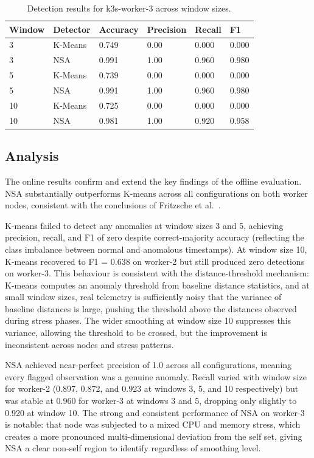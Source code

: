 \begin{table}[h]
    \centering
    \begin{tabular}{llllll}
        \hline
        \textbf{Window} & \textbf{Detector} & \textbf{Accuracy} & \textbf{Precision} & \textbf{Recall} & \textbf{F1} \\
        \hline
        3  & K-Means & 0.749 & 0.00 & 0.000 & 0.000 \\
        3  & NSA     & 0.991 & 1.00 & 0.960 & 0.980 \\
        5  & K-Means & 0.739 & 0.00 & 0.000 & 0.000 \\
        5  & NSA     & 0.991 & 1.00 & 0.960 & 0.980 \\
        10 & K-Means & 0.725 & 0.00 & 0.000 & 0.000 \\
        10 & NSA     & 0.981 & 1.00 & 0.920 & 0.958 \\
        \hline
    \end{tabular}
    \caption{Detection results for k3s-worker-3 across window sizes.}
    \label{tab:worker-results-3}
\end{table}

\subsection{Analysis}

The online results confirm and extend the key findings of the offline evaluation. NSA substantially outperforms K-means across all configurations on both worker nodes, consistent with the conclusions of Fritzsche et al.~\cite{fritzsche2024lightweight}.

K-means failed to detect any anomalies at window sizes 3 and 5, achieving precision, recall, and F1 of zero despite correct-majority accuracy (reflecting the class imbalance between normal and anomalous timestamps). At window size 10, K-means recovered to F1 = 0.638 on worker-2 but still produced zero detections on worker-3. This behaviour is consistent with the distance-threshold mechanism: K-means computes an anomaly threshold from baseline distance statistics, and at small window sizes, real telemetry is sufficiently noisy that the variance of baseline distances is large, pushing the threshold above the distances observed during stress phases. The wider smoothing at window size 10 suppresses this variance, allowing the threshold to be crossed, but the improvement is inconsistent across nodes and stress patterns.

NSA achieved near-perfect precision of 1.0 across all configurations, meaning every flagged observation was a genuine anomaly. Recall varied with window size for worker-2 (0.897, 0.872, and 0.923 at windows 3, 5, and 10 respectively) but was stable at 0.960 for worker-3 at windows 3 and 5, dropping only slightly to 0.920 at window 10. The strong and consistent performance of NSA on worker-3 is notable: that node was subjected to a mixed CPU and memory stress, which creates a more pronounced multi-dimensional deviation from the self set, giving NSA a clear non-self region to identify regardless of smoothing level.

